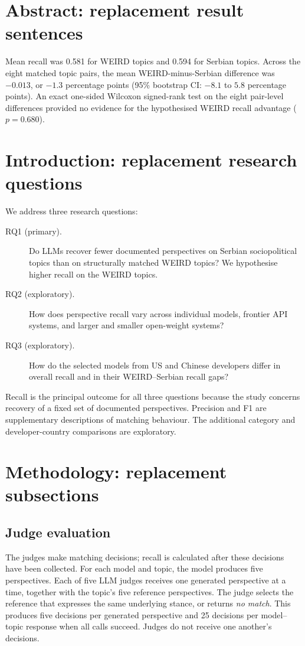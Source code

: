 
\section*{Abstract: replacement result sentences}
Mean recall was 0.581 for WEIRD topics and 0.594 for Serbian topics.
Across the eight matched topic pairs, the mean WEIRD-minus-Serbian difference
was $-0.013$, or $-1.3$ percentage points (95\% bootstrap CI: $-8.1$ to
$5.8$ percentage points). An exact one-sided Wilcoxon signed-rank test on
the eight pair-level differences provided no evidence for the hypothesised
WEIRD recall advantage ($p=0.680$).

\section*{Introduction: replacement research questions}
We address three research questions:
\begin{description}
\item[RQ1 (primary).] Do LLMs recover fewer documented perspectives on
Serbian sociopolitical topics than on structurally matched WEIRD topics?
We hypothesise higher recall on the WEIRD topics.
\item[RQ2 (exploratory).] How does perspective recall vary across individual
models, frontier API systems, and larger and smaller open-weight systems?
\item[RQ3 (exploratory).] How do the selected models from US and Chinese
developers differ in overall recall and in their WEIRD--Serbian recall gaps?
\end{description}
Recall is the principal outcome for all three questions because the study
concerns recovery of a fixed set of documented perspectives. Precision and
F1 are supplementary descriptions of matching behaviour. The additional
category and developer-country comparisons are exploratory.

\setcounter{section}{2}
\section{Methodology: replacement subsections}
\setcounter{subsection}{2}
\subsection{Judge evaluation}
\label{sec:judge-evaluation}
The judges make matching decisions; recall is calculated after these
decisions have been collected. For each model and topic, the model produces
five perspectives. Each of five LLM judges receives one generated
perspective at a time, together with the topic's five reference perspectives.
The judge selects the reference that expresses the same underlying stance,
or returns \emph{no match}. This produces five decisions per generated
perspective and 25 decisions per model--topic response when all calls succeed.
Judges do not receive one another's decisions.

